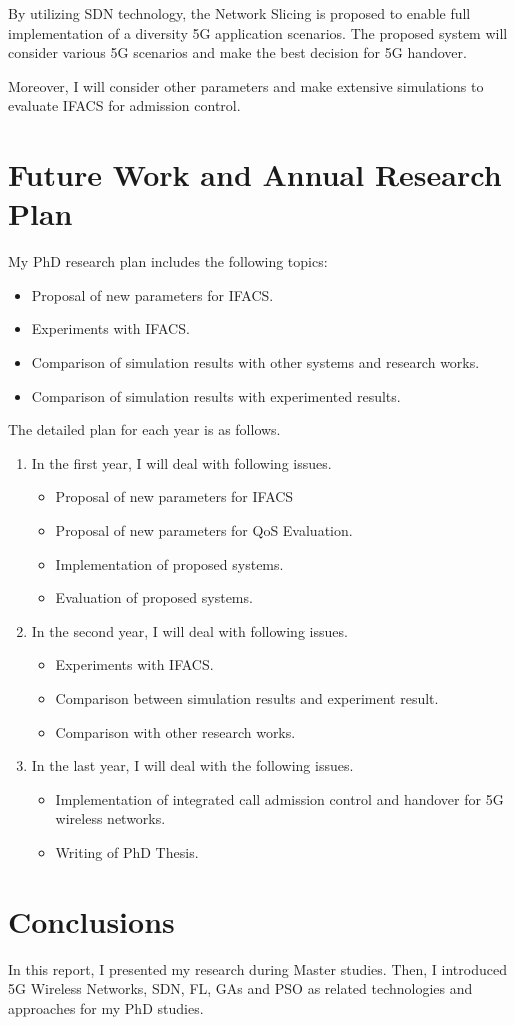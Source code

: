 \documentclass[graybox]{svmult}
\begin{document}
By utilizing SDN technology, the Network Slicing is proposed to enable full implementation of a diversity 5G application scenarios. The proposed system will consider various 5G scenarios and make the best decision for 5G handover.	

Moreover, I will consider other parameters and make extensive simulations to evaluate IFACS for admission control.




\section{Future Work and Annual Research Plan}
\label{sec:conc}
My PhD research plan includes the following topics:
\begin{itemize}
	\item Proposal of new parameters for IFACS.
	\item Experiments with IFACS. 
	\item Comparison of simulation results with other systems and research works.
	\item Comparison of simulation results with experimented results.
\end{itemize}

The detailed plan for each year is as follows.
\begin{enumerate}
	\item In the first year, I will deal with following issues.
	\begin{itemize}
		\item Proposal of new parameters for IFACS
		\item Proposal of new parameters for QoS Evaluation.
		\item Implementation of proposed systems. 
		\item Evaluation of proposed systems.
	\end{itemize}
	\item In the second year, I will deal with following issues.
	\begin{itemize}
		\item Experiments with IFACS. 
		\item Comparison between simulation results and experiment result.
		\item Comparison with other research works.
	\end{itemize}
	\item In the last year, I will deal with the following issues.
	\begin{itemize}
		\item Implementation of integrated call admission control and handover for 5G wireless networks.
		\item Writing of PhD Thesis.
	\end{itemize}
\end{enumerate}


\section{Conclusions}
In this report, I presented my research during Master studies. Then, I introduced 5G Wireless Networks, SDN, FL, GAs and PSO as related technologies and approaches for my PhD studies.




\end{document}
